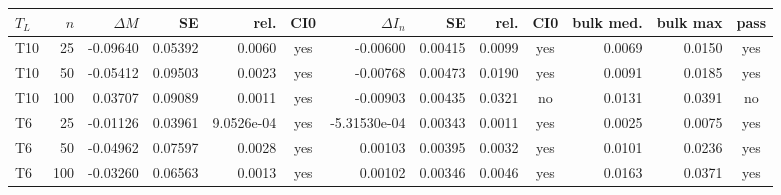 \documentclass[10pt]{article}
\begin{document}
\begin{landscape}
\scriptsize
\begin{longtable}{l r r r r c r r r c r r c}
\toprule
$T_L$ & $n$ & $\Delta M$ & SE & rel. & CI0 & $\Delta I_n$ & SE & rel. & CI0 & bulk med. & bulk max & pass\\
\midrule
\endfirsthead
T10 & 25 & -0.09640 & 0.05392 & 0.0060 & yes & -0.00600 & 0.00415 & 0.0099 & yes & 0.0069 & 0.0150 & yes \\
T10 & 50 & -0.05412 & 0.09503 & 0.0023 & yes & -0.00768 & 0.00473 & 0.0190 & yes & 0.0091 & 0.0185 & yes \\
T10 & 100 & 0.03707 & 0.09089 & 0.0011 & yes & -0.00903 & 0.00435 & 0.0321 & no & 0.0131 & 0.0391 & no \\
T6 & 25 & -0.01126 & 0.03961 & 9.0526e-04 & yes & -5.31530e-04 & 0.00343 & 0.0011 & yes & 0.0025 & 0.0075 & yes \\
T6 & 50 & -0.04962 & 0.07597 & 0.0028 & yes & 0.00103 & 0.00395 & 0.0032 & yes & 0.0101 & 0.0236 & yes \\
T6 & 100 & -0.03260 & 0.06563 & 0.0013 & yes & 0.00102 & 0.00346 & 0.0046 & yes & 0.0163 & 0.0371 & yes \\
\bottomrule
\end{longtable}
\end{landscape}
\end{document}
